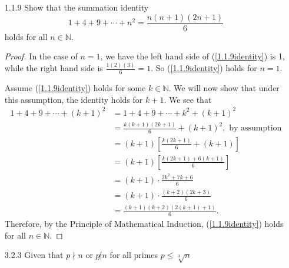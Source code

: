 \documentclass[12pt]{article}
\newcommand{\N}{\mathds{N}}
\begin{document}
\begin{enumerate}
\item[1.1.9] Show that the summation identity \begin{equation}\label{1.1.9identity}1+4+9+\cdots+n^2 = \displaystyle\frac{n(n+1)(2n+1)}{6}\end{equation} holds for all $n \in \N$.

    \begin{proof}
    In the case of $n = 1$, we have the left hand side of (\ref{1.1.9identity}) is 1, while the right hand side is $\displaystyle\frac{1(2)(3)}{6} = 1$.  So (\ref{1.1.9identity}) holds for $n = 1$.  
    
    Assume (\ref{1.1.9identity}) holds for some $k \in \N$.  We will now show that under this assumption, the identity holds for $k+1$.  We see that
    $$\begin{aligned}
    1 + 4 + 9 + \cdots + (k+1)^2 &= 1 + 4 + 9 + \cdots + k^2 + (k+1)^2\\
    &= \frac{k(k+1)(2k+1)}{6} + (k+1)^2, \text{ by assumption}\\
    &= (k+1)\left[\frac{k(2k+1)}{6} + (k+1)\right]\\
    &= (k+1)\left[\frac{k(2k+1)+6(k+1)}{6}\right]\\
    &= (k+1)\cdot\frac{2k^2+7k+6}{6}\\
    &= (k+1)\cdot\frac{(k+2)(2k+3)}{6}\\
    &= \frac{(k+1)(k+2)(2(k+1)+1)}{6}.
    \end{aligned}$$  Therefore, by the Principle of Mathematical Induction, (\ref{1.1.9identity}) holds for all $n \in \N$.
    \end{proof}
    
 \item[3.2.3] Given that $p\nmid n$ or $p\not| n$ for all primes $p\le\sqrt[3]{n}$
\end{enumerate}
\end{document}
